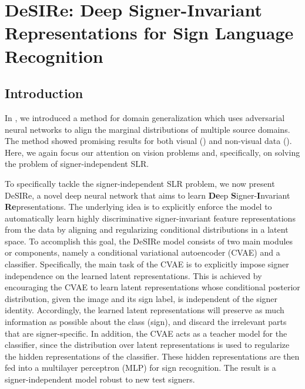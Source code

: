 \section{DeSIRe: Deep Signer-Invariant Representations for Sign Language Recognition}
\label{sec:desire}

\subsection{Introduction}
In , we introduced a method for domain generalization which uses adversarial neural networks to align the marginal distributions of multiple source domains. The method showed promising results for both visual () and non-visual data (). Here, we again focus our attention on vision problems and, specifically, on solving the problem of signer-independent SLR.

To specifically tackle the signer-independent SLR problem, we now present DeSIRe, a novel deep neural network that aims to learn \textbf{De}ep \textbf{S}igner-\textbf{I}nvariant \textbf{Re}presentations. The underlying idea is to explicitly enforce the model to automatically learn highly discriminative signer-invariant feature representations from the data by aligning and regularizing conditional distributions in a latent space. To accomplish this goal, the DeSIRe model consists of two main modules or components, namely a conditional variational autoencoder (CVAE) and a classifier. Specifically, the main task of the CVAE is to explicitly impose signer independence on the learned latent representations. This is achieved by encouraging the CVAE to learn latent representations whose conditional posterior distribution, given the image and its sign label, is independent of the signer identity. Accordingly, the learned latent representations will preserve as much information as possible about the class (sign), and discard the irrelevant parts that are signer-specific. In addition, the CVAE acts as a teacher model for the classifier, since the distribution over latent representations is used to regularize the hidden representations of the classifier. These hidden representations are then fed into a multilayer perceptron (MLP) for sign recognition. The result is a signer-independent model robust to new test signers.

